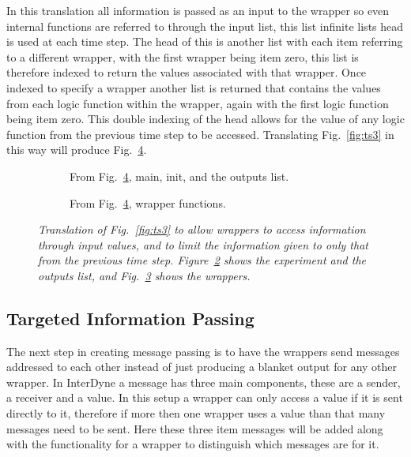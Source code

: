 \documentclass{article}
\begin{document}
In this translation all information is passed as an input to the wrapper so even internal functions are referred to through the input list, this list infinite lists head is used at each time step. The head of this is another list with each item referring to a different wrapper, with the first wrapper being item zero, this list is therefore indexed to return the values associated with that wrapper. Once indexed to specify a wrapper another list is returned that contains the values from each logic function within the wrapper, again with the first logic function being item zero. This double indexing of the head allows for the value of any logic function from the previous time step to be accessed. Translating Fig.~\ref{fig:ts3} in this way will produce Fig.~\ref{fig:ts4}.
\begin{figure}[H]
	\centering
	\begin{subfigure}[b]{1\textwidth}
	
	\caption{From Fig.~\ref{fig:ts4}, main, init, and the outputs list.}
        \label{fig:gull}
	\end{subfigure}
	\caption*{}
\end{figure}
	
\begin{figure}[H]\ContinuedFloat
	\centering
	\begin{subfigure}[b]{1\textwidth}
	
	\caption{From Fig.~\ref{fig:ts4}, wrapper functions.}
        \label{fig:gull2}
	\end{subfigure}
	\caption{\it Translation of Fig.~\ref{fig:ts3} to allow wrappers to access information through input values, and to limit the information given to only that from the previous time step. Figure~\ref{fig:gull} shows the experiment and the outputs list, and Fig.~\ref{fig:gull2} shows the wrappers.}
	\label{fig:ts4}
\end{figure} 






\subsection{Targeted Information Passing}
The next step in creating message passing is to have the wrappers send messages addressed to each other instead of just producing a blanket output for any other wrapper. In InterDyne a message has three main components, these are a sender, a receiver and a value. In this setup a wrapper can only access a value if it is sent directly to it, therefore if more then one wrapper uses a value than that many messages need to be sent. Here these three item messages will be added along with the functionality for a wrapper to distinguish which messages are for it. 
\end{document}
